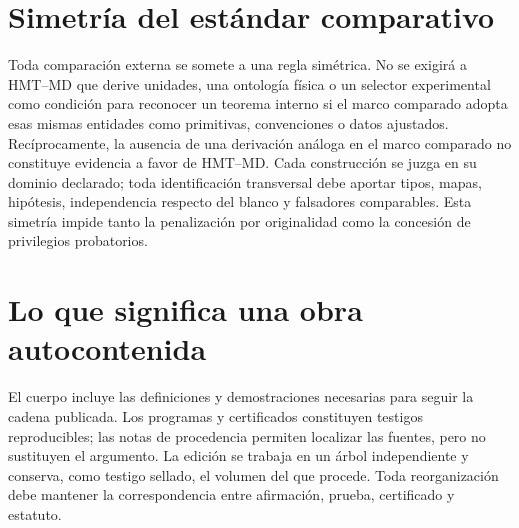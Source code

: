\section*{Simetría del estándar comparativo}

Toda comparación externa se somete a una regla simétrica. No se exigirá a
HMT--MD que derive unidades, una ontología física o un selector experimental
como condición para reconocer un teorema interno si el marco comparado adopta
esas mismas entidades como primitivas, convenciones o datos ajustados.
Recíprocamente, la ausencia de una derivación análoga en el marco comparado no
constituye evidencia a favor de HMT--MD. Cada construcción se juzga en su
dominio declarado; toda identificación transversal debe aportar tipos,
mapas, hipótesis, independencia respecto del blanco y falsadores comparables.
Esta simetría impide tanto la penalización por originalidad como la concesión
de privilegios probatorios.

\section*{Lo que significa una obra autocontenida}

El cuerpo incluye las definiciones y demostraciones necesarias para seguir la
cadena publicada. Los programas y certificados constituyen testigos
reproducibles; las notas de procedencia permiten localizar las fuentes, pero
no sustituyen el argumento. La edición se trabaja en un árbol independiente y
conserva, como testigo sellado, el volumen del que procede. Toda reorganización
debe mantener la correspondencia entre afirmación, prueba, certificado y
estatuto.
